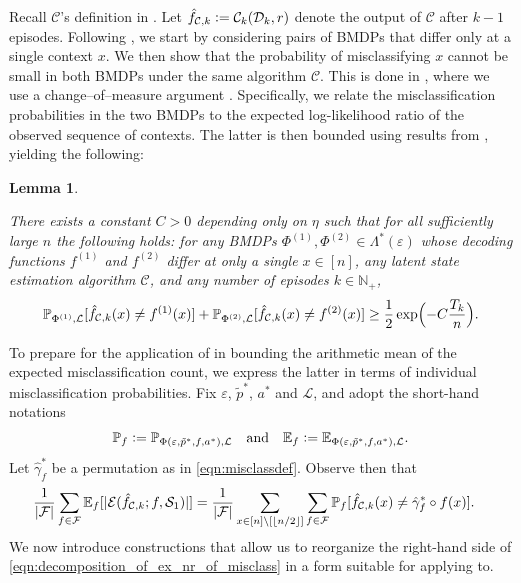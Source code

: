 \documentclass[11pt]{article}
\newcommand{\eqdef}{\vcentcolon=}
\newcommand{\mcC}{\mathcal{C}}
\newcommand{\mcD}{\mathcal{D}}
\newcommand{\mcE}{\mathcal{E}}
\newcommand{\mcF}{\mathcal{F}}
\newcommand{\mcL}{\mathcal{L}}
\newcommand{\mcS}{\mathcal{S}}
\newcommand{\mbbP}{\mathbb{P}}
\newcommand{\mbbE}{\mathbb{E}}
\newcommand{\mbbN}{\mathbb{N}}
\DeclarePairedDelimiter\floor{\lfloor}{\rfloor}
\newtheorem{lemma}[theorem]{Lemma}
\theoremstyle{definition}
\theoremstyle{definition}
\begin{document}
Recall $\mcC$'s definition in .
Let $\hat{f}_{\mcC,k}\eqdef \mcC_{k}(\mcD_{k},r)$ denote the output of $\mcC$ after $k-1$ episodes.
Following \cite{Jedra:2022,Sanders:2020}, we start by considering pairs of \glspl{BMDP} that differ only at a single context $x$.
We then show that the probability of misclassifying $x$ cannot be small in both \glspl{BMDP} under the same algorithm $\mcC$.
This is done in , where we use a change--of--measure argument \cite{NEURIPS2019_10a5ab2d}.
Specifically, we relate the misclassification probabilities in the two \glspl{BMDP} to the expected log-likelihood ratio of the observed sequence of contexts.
The latter is then bounded using results from \cite{Jedra:2022}, yielding the following:
\begin{lemma}
	\label{lem:local_clustering_error_lower_bound}

	There exists a constant $C>0$ depending only on $\eta$ such that
	for all sufficiently large $n$ the following holds:
	for any \glspl{BMDP} $\Phi^{(1)},\Phi^{(2)} \in \Lambda^*(\varepsilon)$ whose decoding functions $f^{(1)}$ and $f^{(2)}$ differ at only a single $x \in[n]$,
	any latent state estimation algorithm $\mcC$,
	and any number of episodes $k\in\mbbN_+$,
	\begin{align}
		\mbbP_{\Phi^{(1)},\mcL}[\hat{f}_{\mcC,k}(x)\neq f^{(1)}(x)]
		+
		\mbbP_{\Phi^{(2)},\mcL}[\hat{f}_{\mcC,k}(x) \neq f^{(2)}(x)]
		\geq
		\frac{1}{2}
		\exp
		\Bigl(
		-
		C\frac{T_{k}}{n}
		\Bigr)
		.
		\label{eqn:local_clustering_error_lower_bound}
	\end{align}
\end{lemma}

To prepare for the application of  in bounding the arithmetic mean of the expected misclassification count, we express the latter in terms of individual misclassification probabilities.
Fix $\varepsilon$, $\tilde{p}^*$, $a^*$ and $\mcL$, and adopt the short-hand notations
\begin{equation}
	\label{eqn:short-hand_notation_for_measures}
	\mbbP_{f}
	\eqdef
	\mbbP_{\Phi(\varepsilon,\tilde{p}^*,f,a^*),\mcL}
	\quad
	\mathrm{and}
	\quad
	\mbbE_f
	\eqdef
	\mbbE_{\Phi(\varepsilon,\tilde{p}^*,f,a^*),\mcL}
	.
\end{equation}
Let $\hat{\gamma}^*_f$ be a permutation as in \eqref{eqn:misclassdef}.
Observe then that
\begin{equation}
    \begin{split}
         &
        \frac{1}{|\mcF|}
        \sum_{f\in\mcF}
        \mbbE_{f}[|\mcE(\hat{f}_{\mcC,k};f,\mcS_1)|]
        =
        \frac{1}{|\mcF|}
        \sum_{x \in[n]\setminus[\floor{n/2}]}
        \sum_{f\in\mcF}
        \mbbP_{f}[
            \hat{f}_{\mcC,k}(x) \neq \hat{\gamma}^*_f \circ f(x)
        ]
        .
    \end{split}
    \label{eqn:decomposition_of_ex_nr_of_misclass}
\end{equation}
We now introduce constructions that allow us to reorganize the right-hand side of \eqref{eqn:decomposition_of_ex_nr_of_misclass} in a form suitable for applying  to.
\end{document}
